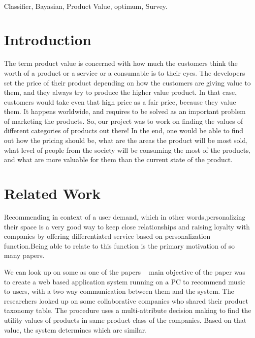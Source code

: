 \documentclass[conference]{IEEEtran}
\begin{document}
\begin{IEEEkeywords}
\\ Classifier, Bayasian, Product Value, optimum, Survey.
\end{IEEEkeywords}

\section{Introduction}

The term product value is concerned with how much the customers think the worth of a product or a service or a consumable is to their eyes. The developers set the price of their product depending on how the customers are giving value to them, and they always try to produce the higher value product. In that case, customers would take even that high price as a fair price, because they value them. It happens worldwide, and requires to be solved as an important problem of marketing the products. So, our project was to work on finding the values of different categories of products out there! In the end, one would be able to find out how the pricing should be, what are the areas the product will be most sold, what level of people from the society will be consuming the most of the products, and what are more valuable for them than the current state of the product.




\section{Related Work}
Recommending in  context of  a user  demand, which in  other  words,personalizing their space is a very good way to keep close relationships and raising loyalty with companies  by  offering  differentiated  service  based  on  personalization  function.Being able to relate to this function is the primary motivation of so many papers.

We can look up on some as one of the papers ~\cite{choi2006personalized} main  objective  of  the paper  was  to create  a  web  based  application  system running  on  a  PC  to recommend  music  to  users,  with  a  two  way  communication between  them  and  the system.  The  researchers looked  up  on  some  collaborative companies who shared their product taxonomy table. The procedure uses a multi-attribute decision making to find the utility values of products in same product class of the companies. Based on that value, the system determines which are similar. 
\end{document}
